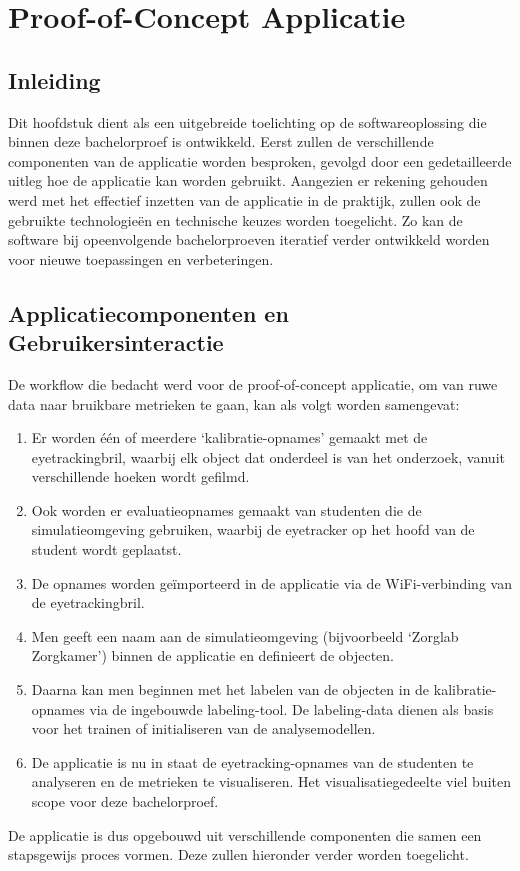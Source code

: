 \chapter{Proof-of-Concept Applicatie}
\label{ch:ontwikkeling}

\section{Inleiding}

Dit hoofdstuk dient als een uitgebreide toelichting op de softwareoplossing die binnen deze bachelorproef is ontwikkeld.
Eerst zullen de verschillende componenten van de applicatie worden besproken, gevolgd door een gedetailleerde uitleg hoe de applicatie kan worden gebruikt.
Aangezien er rekening gehouden werd met het effectief inzetten van de applicatie in de praktijk, zullen ook de gebruikte technologieën en technische keuzes worden toegelicht.
Zo kan de software bij opeenvolgende bachelorproeven iteratief verder ontwikkeld worden voor nieuwe toepassingen en verbeteringen.

\section{Applicatiecomponenten en Gebruikersinteractie}

De workflow die bedacht werd voor de proof-of-concept applicatie, om van ruwe data naar bruikbare metrieken te gaan, kan als volgt worden samengevat:
\begin{enumerate}
    \item Er worden één of meerdere `kalibratie-opnames' gemaakt met de eyetrackingbril, waarbij elk object dat onderdeel is van het onderzoek, vanuit verschillende hoeken wordt gefilmd.
    \item Ook worden er evaluatieopnames gemaakt van studenten die de simulatieomgeving gebruiken, waarbij de eyetracker op het hoofd van de student wor\-dt geplaatst.
    \item De opnames worden geïmporteerd in de applicatie via de WiFi-verbinding van de eyetrackingbril.
    \item Men geeft een naam aan de simulatieomgeving (bijvoorbeeld `Zorglab Zorgkamer') binnen de applicatie en definieert de objecten.
    \item Daarna kan men beginnen met het labelen van de objecten in de kalibratie-opnames via de ingebouwde labeling-tool. De labeling-data dienen als basis voor het trainen of initialiseren van de analysemodellen.
    \item De applicatie is nu in staat de eyetracking-opnames van de studenten te analyseren en de metrieken te visualiseren. 
    Het visualisatiegedeelte viel buiten scope voor deze bachelorproef.
\end{enumerate}
De applicatie is dus opgebouwd uit verschillende componenten die samen een stapsgewijs proces vormen. Deze zullen hieronder verder worden toegelicht.


